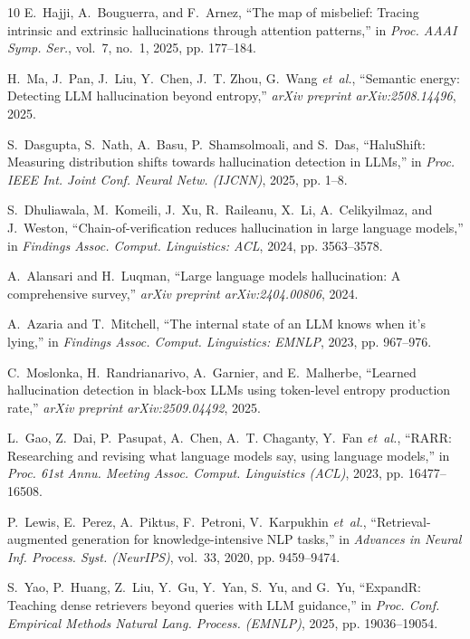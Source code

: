 \documentclass[journal]{IEEEtran}
\begin{document}
\begin{thebibliography}{10}
E.~Hajji, A.~Bouguerra, and F.~Arnez, ``The map of misbelief: Tracing intrinsic and extrinsic hallucinations through attention patterns,'' in \emph{Proc. AAAI Symp. Ser.}, vol.~7, no.~1, 2025, pp. 177--184.

H.~Ma, J.~Pan, J.~Liu, Y.~Chen, J.~T. Zhou, G.~Wang \emph{et~al.}, ``Semantic energy: Detecting LLM hallucination beyond entropy,'' \emph{arXiv preprint arXiv:2508.14496}, 2025.

S.~Dasgupta, S.~Nath, A.~Basu, P.~Shamsolmoali, and S.~Das, ``HaluShift: Measuring distribution shifts towards hallucination detection in LLMs,'' in \emph{Proc. IEEE Int. Joint Conf. Neural Netw. (IJCNN)}, 2025, pp. 1--8.

S.~Dhuliawala, M.~Komeili, J.~Xu, R.~Raileanu, X.~Li, A.~Celikyilmaz, and J.~Weston, ``Chain-of-verification reduces hallucination in large language models,'' in \emph{Findings Assoc. Comput. Linguistics: ACL}, 2024, pp. 3563--3578.

A.~Alansari and H.~Luqman, ``Large language models hallucination: A comprehensive survey,'' \emph{arXiv preprint arXiv:2404.00806}, 2024.

A.~Azaria and T.~Mitchell, ``The internal state of an LLM knows when it's lying,'' in \emph{Findings Assoc. Comput. Linguistics: EMNLP}, 2023, pp. 967--976.

C.~Moslonka, H.~Randrianarivo, A.~Garnier, and E.~Malherbe, ``Learned hallucination detection in black-box LLMs using token-level entropy production rate,'' \emph{arXiv preprint arXiv:2509.04492}, 2025.

L.~Gao, Z.~Dai, P.~Pasupat, A.~Chen, A.~T. Chaganty, Y.~Fan \emph{et~al.}, ``RARR: Researching and revising what language models say, using language models,'' in \emph{Proc. 61st Annu. Meeting Assoc. Comput. Linguistics (ACL)}, 2023, pp. 16477--16508.

P.~Lewis, E.~Perez, A.~Piktus, F.~Petroni, V.~Karpukhin \emph{et~al.}, ``Retrieval-augmented generation for knowledge-intensive NLP tasks,'' in \emph{Advances in Neural Inf. Process. Syst. (NeurIPS)}, vol.~33, 2020, pp. 9459--9474.

S.~Yao, P.~Huang, Z.~Liu, Y.~Gu, Y.~Yan, S.~Yu, and G.~Yu, ``ExpandR: Teaching dense retrievers beyond queries with LLM guidance,'' in \emph{Proc. Conf. Empirical Methods Natural Lang. Process. (EMNLP)}, 2025, pp. 19036--19054.


\end{thebibliography}
\end{document}
